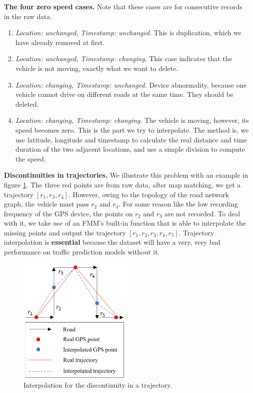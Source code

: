 \vspace{\baselineskip}

\textbf{The four zero speed cases.} Note that these cases are for consecutive records in the raw data.
\begin{enumerate}
  \item \textit{Location: unchanged, Timestamp: unchanged.} This is duplication, which we have already removed at first.
  \item \textit{Location: unchanged, Timestamp: changing.} This case indicates that the vehicle is not moving, exactly what we want to delete.
  \item \textit{Location: changing, Timestamp: unchanged.} Device abnormality, because one vehicle cannot drive on different roads at the same time. They should be deleted.
  \item \textit{Location: changing, Timestamp: changing.} The vehicle is moving, however, its speed becomes zero. This is the part we try to interpolate. The method is, we use latitude, longitude and timestamp to calculate the real distance and time duration of the two adjacent locations, and use a simple division to compute the speed.
\end{enumerate}

\vspace{\baselineskip}

\textbf{Discontinuities in trajectories.} We illustrate this problem with an example in figure \ref{fig: traj_interpolate}. The three red points are from raw data, after map matching, we get a trajectory $[r_1, r_3, r_4]$. However, owing to the topology of the road network graph, the vehicle must pass $r_2$ and $r_3$. For some reason like the low recording frequency of the GPS device, the points on $r_2$ and $r_3$ are not recorded. To deal with it, we take use of an FMM's built-in function that is able to interpolate the missing points and output the trajectory $[r_1, r_2, r_3, r_4, r_5]$. Trajectory interpolation is \textbf{essential} because the dataset will have a very, very bad performance on traffic prediction models without it.

\begin{figure}[htb]
  \centering
  \includegraphics[width=0.5\textwidth]{images/traj_interpolate.png}
  \caption{Interpolation for the discontinuity in a trajectory.}
  \label{fig: traj_interpolate}
\end{figure}

